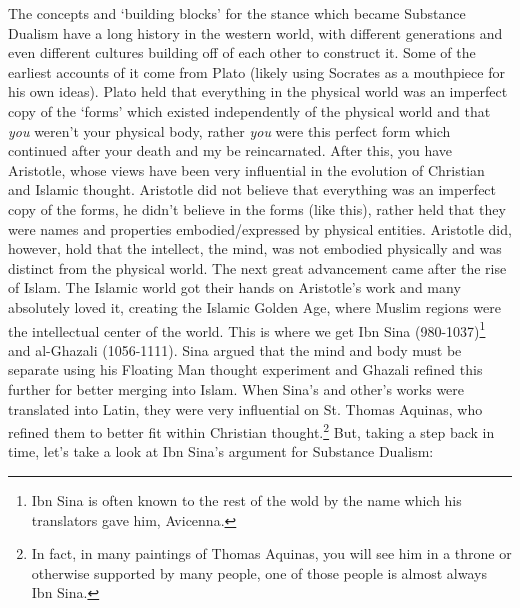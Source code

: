 The concepts and `building blocks' for the stance which became Substance Dualism have a long history in the western world, with different generations and even different cultures building off of each other to construct it. Some of the earliest accounts of it come from Plato (likely using Socrates as a mouthpiece for his own ideas). Plato held that everything in the physical world was an imperfect copy of the `forms' which existed independently of the physical world and that \emph{you} weren't your physical body, rather \emph{you} were this perfect form which continued after your death and my be reincarnated. After this, you have Aristotle, whose views have been very influential in the evolution of Christian and Islamic thought. Aristotle did not believe that everything was an imperfect copy of the forms, he didn’t believe in the forms (like this), rather held that they were names and properties embodied/expressed by physical entities. Aristotle did, however, hold that the intellect, the mind, was not embodied physically and was distinct from the physical world. The next great advancement came after the rise of Islam. The Islamic world got their hands on Aristotle's work and many absolutely loved it, creating the Islamic Golden Age, where Muslim regions were the intellectual center of the world. This is where we get Ibn Sina (980-1037)\footnote{Ibn Sina is often known to the rest of the wold by the name which his translators gave him, Avicenna.} and al-Ghazali (1056-1111). Sina argued that the mind and body must be separate using his Floating Man thought experiment and Ghazali refined this further for better merging into Islam. When Sina's and other's works were translated into Latin, they were very influential on St. Thomas Aquinas, who refined them to better fit within Christian thought.\footnote{In fact, in many paintings of Thomas Aquinas, you will see him in a throne or otherwise supported by many people, one of those people is almost always Ibn Sina.} But, taking a step back in time, let's take a look at Ibn Sina's argument for Substance Dualism: 


